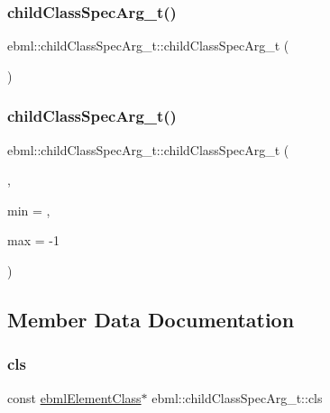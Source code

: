 \subsubsection{\texorpdfstring{child\+Class\+Spec\+Arg\+\_\+t()}{childClassSpecArg\_t()}\hspace{0.1cm}{\footnotesize\ttfamily [1/2]}}
{\footnotesize\ttfamily ebml\+::child\+Class\+Spec\+Arg\+\_\+t\+::child\+Class\+Spec\+Arg\+\_\+t (\begin{DoxyParamCaption}{ }\end{DoxyParamCaption})}

\mbox{\label{structebml_1_1childClassSpecArg__t_a9f730585de19089fb0ac3ebdfaeb566c}} 
\subsubsection{\texorpdfstring{child\+Class\+Spec\+Arg\+\_\+t()}{childClassSpecArg\_t()}\hspace{0.1cm}{\footnotesize\ttfamily [2/2]}}
{\footnotesize\ttfamily ebml\+::child\+Class\+Spec\+Arg\+\_\+t\+::child\+Class\+Spec\+Arg\+\_\+t (\begin{DoxyParamCaption}\item[{const \mbox{\hyperlink{classebml_1_1ebmlElementClass}{ebml\+Element\+Class}} $\ast$}]{,  }\item[{unsigned long}]{min = {},  }\item[{long}]{max = {\ttfamily -\/1} }\end{DoxyParamCaption})}



\subsection{Member Data Documentation}
\mbox{\label{structebml_1_1childClassSpecArg__t_a0bbd25beadc7caf9837ae2fe9381ed16}} 
\subsubsection{\texorpdfstring{cls}{cls}}
{\footnotesize\ttfamily const \mbox{\hyperlink{classebml_1_1ebmlElementClass}{ebml\+Element\+Class}}$\ast$ ebml\+::child\+Class\+Spec\+Arg\+\_\+t\+::cls}

